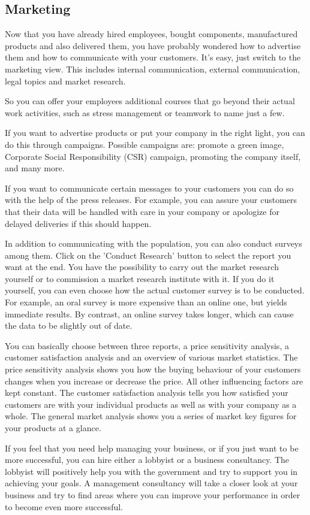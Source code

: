 \subsection{Marketing} \label{marketing_manual}


Now that you have already hired employees, bought components, manufactured products and also delivered them, you have probably wondered how to advertise them and how to communicate with your customers. It's easy, just switch to the marketing view. This includes internal communication, external communication, legal topics and market research.

So you can offer your employees additional courses that go beyond their actual work activities, such as stress management or teamwork to name just a few. 

If you want to advertise products or put your company in the right light, you can do this through campaigns. Possible campaigns are: promote a green image, Corporate Social Responsibility (\gls{CSR}) campaign, promoting the company itself, and many more.

If you want to communicate certain messages to your customers you can do so with the help of the press releases. For example, you can assure your customers that their data will be handled with care in your company or apologize for delayed deliveries if this should happen.

In addition to communicating with the population, you can also conduct surveys among them. Click on the 'Conduct Research' button to select the report you want at the end. You have the possibility to carry out the market research yourself or to commission a market research institute with it. If you do it yourself, you can even choose how the actual customer survey is to be conducted. For example, an oral survey is more expensive than an online one, but yields immediate results.  By contrast, an online survey takes longer, which can cause the data to be slightly out of date.

You can basically choose between three reports, a price sensitivity analysis, a customer satisfaction analysis and an overview of various market statistics. The price sensitivity analysis shows you how the buying behaviour of your customers changes when you increase or decrease the price. All other influencing factors are kept constant. The customer satisfaction analysis tells you how satisfied your customers are with your individual products as well as with your company as a whole. The general market analysis shows you a series of market key figures for your products at a glance. 

If you feel that you need help managing your business, or if you just want to be more successful, you can hire either a lobbyist or a business consultancy. The lobbyist will positively help you with the government and try to support you in achieving your goals. 
A management consultancy will take a closer look at your business and try to find areas where you can improve your performance in order to become even more successful.